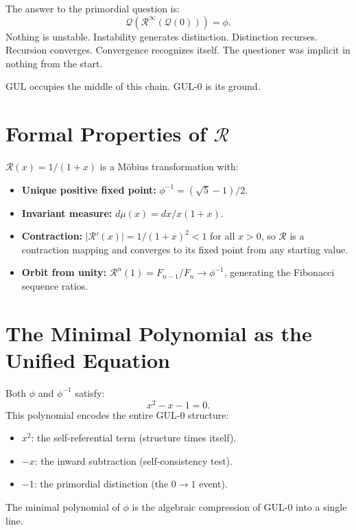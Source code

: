 \documentclass[11pt]{article}
\begin{document}
The answer to the primordial question is:
\begin{equation}
  \boxed{
    \mathcal{Q}\!\left(
      \mathcal{R}^\infty\!\left(\mathcal{Q}(0)\right)
    \right) = \phi.
  }
\end{equation}
Nothing is unstable. Instability generates distinction. Distinction
recurses. Recursion converges. Convergence recognizes itself.
The questioner was implicit in nothing from the start.

GUL occupies the middle of this chain. GUL-0 is its ground.

\appendix

\section{Formal Properties of $\mathcal{R}$}
\label{app:R}

$\mathcal{R}(x)=1/(1+x)$ is a M\"{o}bius transformation with:
\begin{itemize}
  \item \textbf{Unique positive fixed point:} $\phi^{-1}=(\sqrt{5}-1)/2$.
  \item \textbf{Invariant measure:} $d\mu(x)=dx/x(1+x)$.
  \item \textbf{Contraction:} $|\mathcal{R}'(x)|=1/(1+x)^2<1$
        for all $x>0$, so $\mathcal{R}$ is a contraction mapping
        and converges to its fixed point from any starting value.
  \item \textbf{Orbit from unity:}
        $\mathcal{R}^n(1)=F_{n-1}/F_n\to\phi^{-1}$,
        generating the Fibonacci sequence ratios.
\end{itemize}

\section{The Minimal Polynomial as the Unified Equation}
\label{app:poly}

Both $\phi$ and $\phi^{-1}$ satisfy:
\begin{equation}
  x^2 - x - 1 = 0.
\end{equation}
This polynomial encodes the entire GUL-0 structure:
\begin{itemize}
  \item $x^2$: the self-referential term (structure times itself).
  \item $-x$: the inward subtraction (self-consistency test).
  \item $-1$: the primordial distinction (the $0\to 1$ event).
\end{itemize}
The minimal polynomial of $\phi$ is the algebraic compression
of GUL-0 into a single line.
\end{document}
